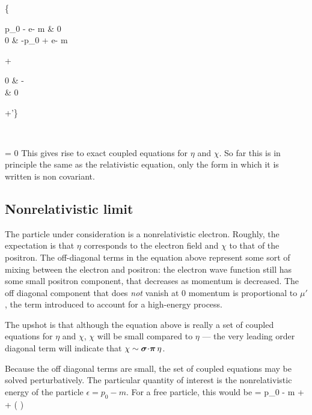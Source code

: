 \beq \label{eq:Sh:matrixEOM}
	\left\{
		\begin{pmatrix}
			p_0 - e\Phi	- m &	0	\\
			0	&	-p_0 + e\Phi - m	\\
		\end{pmatrix}
		+
		\begin{pmatrix}	0 & -\sigdotg{\pi} \\  \sigdotg{\pi} & 0 \end{pmatrix} 
		+\mu' 
	\right\} \begin{pmatrix} \eta \\ \chi \end{pmatrix}
		= 0
\eeq
This gives rise to exact coupled equations for $\eta$ and $\chi$.  So far this is in principle the same as the relativistic equation, only the form in which it is written is non covariant.

\subsection{Nonrelativistic limit}

The particle under consideration is a nonrelativistic electron.  Roughly, the expectation is that $\eta$ corresponds to the electron field and $\chi$ to that of the positron.  The off-diagonal terms in the equation above represent some sort of mixing between the electron and positron: the electron wave function still has some small positron component, that decreases as momentum is decreased.    The off diagonal component that does {\it not} vanish at 0 momentum is proportional to $\mu'$, the term introduced to account for a high-energy process.

The upshot is that although the equation above is really a set of coupled equations for $\eta$ and $\chi$, $\chi$ will be small compared to $\eta$ --- the very leading order diagonal term will indicate that $\chi \sim \mbox{\boldmath$ \sigma $} \hspace{-2pt} \cdot \hspace{-2pt} \mbox{\boldmath$ \pi $} \, \eta$.

Because the off diagonal terms are small, the set of coupled equations may be solved perturbatively.  The particular quantity of interest is the nonrelativistic energy of the particle $\epsilon = p_0 - m$.  For a free particle, this would be
\beq
	\epsilon = p_0 - m \approx {} +  + \left ( \right )
\eeq  


